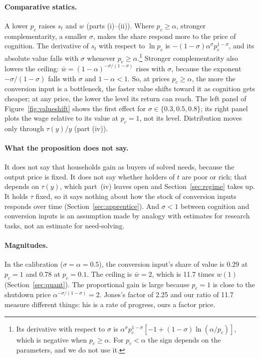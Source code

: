 \documentclass[12pt]{article}
\theoremstyle{remark}
\begin{document}
\paragraph{Comparative statics.} A lower $p_c$ raises $s_t$ and $w$ (parts (i)--(ii)). Where $p_c\ge\alpha$, stronger complementarity, a smaller $\sigma$, makes the share respond more to the price of cognition. The derivative of $s_t$ with respect to $\ln p_c$ is $-(1-\sigma)\alpha^\sigma p_c^{1-\sigma}$, and its absolute value falls with $\sigma$ whenever $p_c\ge\alpha$.\footnote{Its derivative with respect to $\sigma$ is $\alpha^\sigma p_c^{1-\sigma}[-1+(1-\sigma)\ln(\alpha/p_c)]$, which is negative when $p_c\ge\alpha$. For $p_c<\alpha$ the sign depends on the parameters, and we do not use it.} Stronger complementarity also lowers the ceiling: $\bar w=(1-\alpha)^{-\sigma/(1-\sigma)}$ rises with $\sigma$, because the exponent $-\sigma/(1-\sigma)$ falls with $\sigma$ and $1-\alpha<1$. So, at prices $p_c\ge\alpha$, the more the conversion input is a bottleneck, the faster value shifts toward it as cognition gets cheaper; at any price, the lower the level its return can reach. The left panel of Figure~\ref{fig:valueshift} shows the first effect for $\sigma\in\{0.3,0.5,0.8\}$; its right panel plots the wage relative to its value at $p_c=1$, not its level. Distribution moves only through $\tau(y)/y$ (part (iv)).

\paragraph{What the proposition does not say.} It does not say that households gain as buyers of solved needs, because the output price is fixed. It does not say whether holders of $t$ are poor or rich; that depends on $\tau(y)$, which part~(iv) leaves open and Section~\ref{sec:regime} takes up. It holds $\tau$ fixed, so it says nothing about how the stock of conversion inputs responds over time (Section~\ref{sec:apprentice}). And $\sigma<1$ between cognition and conversion inputs is an assumption made by analogy with estimates for research tasks, not an estimate for need-solving.

\paragraph{Magnitudes.} In the calibration ($\sigma=\alpha=0.5$), the conversion input's share of value is 0.29 at $p_c=1$ and 0.78 at $p_c=0.1$. The ceiling is $\bar w=2$, which is 11.7 times $w(1)$ (Section~\ref{sec:quant}). The proportional gain is large because $p_c=1$ is close to the shutdown price $\alpha^{-\sigma/(1-\sigma)}=2$. Jones's factor of 2.25 and our ratio of 11.7 measure different things: his is a rate of progress, ours a factor price.
\end{document}
